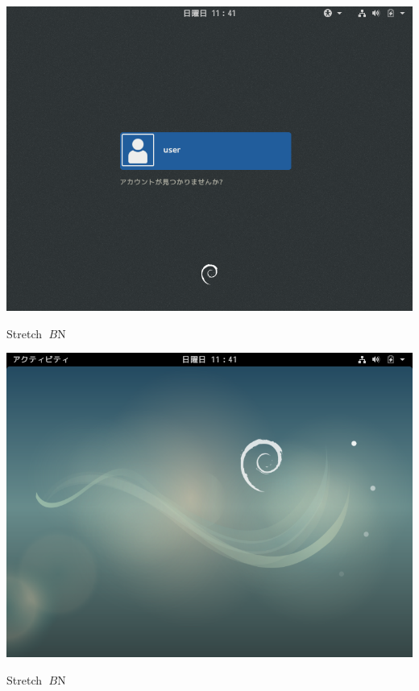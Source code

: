 \documentclass[mingoth,a4paper]{jsarticle}
\begin{document}
{{{{{{{{{{{{{{{{\begin{center}
\includegraphics[keepaspectratio,width=1\hsize]{image201907/stretch_gdm3.png}
\end{center}



Stretch $B$N%

\begin{center}
\includegraphics[keepaspectratio,width=1\hsize]{image201907/stretch_gnome_1.png}
\end{center}



Stretch $B$N%

}}}}}}}}}}}}}}}}
\end{document}

